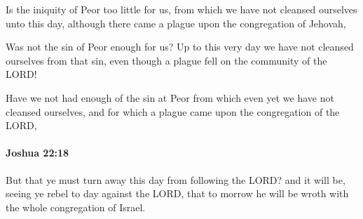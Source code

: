 			\begin{versebox}
					\item[BHS] 
					\item[ASV] Is the iniquity of Peor too little for us, from which we have not cleansed ourselves unto this day, although there came a plague upon the congregation of Jehovah,
					\item[NIV] Was not the sin of Peor enough for us? Up to this very day we have not cleansed ourselves from that sin, even though a plague fell on the community of the LORD!
					\item[NRSV] Have we not had enough of the sin at Peor from which even yet we have not cleansed ourselves, and for which a plague came upon the congregation of the LORD,
			\end{versebox}

		\paragraph{Joshua 22:18} %
			\label{JOSHUA-22-18}

			But that ye must turn away this day from following the LORD? and it will be, seeing ye rebel to day against the LORD, that to morrow he will be wroth with the whole congregation of Israel.

